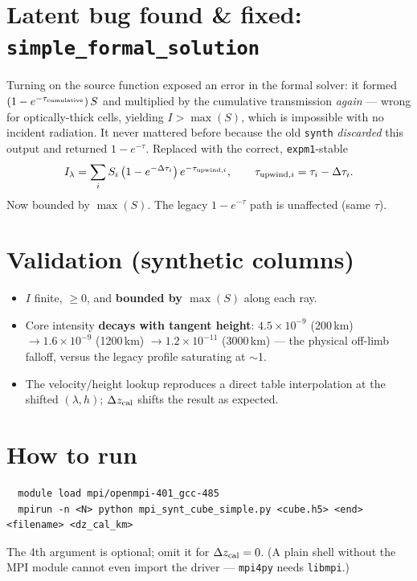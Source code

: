 \documentclass[10pt]{article}
\newcommand{\code}[1]{\texttt{\small #1}}
\begin{document}
\section{\textcolor{warn}{Latent bug found \& fixed:} \code{simple\_formal\_solution}}
Turning on the source function exposed an error in the formal solver: it formed
$(1-e^{-\tau_{\rm cumulative}})\,S$ and multiplied by the cumulative transmission
\emph{again} --- wrong for optically-thick cells, yielding $I>\max(S)$, which is
impossible with no incident radiation. It never mattered before because the old
\code{synth} \emph{discarded} this output and returned $1-e^{-\tau}$. Replaced with
the correct, \code{expm1}-stable
\[
  I_\lambda=\sum_i S_i\,\bigl(1-e^{-\Delta\tau_i}\bigr)\,e^{-\tau_{{\rm upwind},i}},
  \qquad \tau_{{\rm upwind},i}=\tau_i-\Delta\tau_i .
\]
Now bounded by $\max(S)$. The legacy $1-e^{-\tau}$ path is unaffected (same $\tau$).

\section{Validation (synthetic columns)}
\begin{itemize}
  \item $I$ finite, $\ge0$, and \textbf{bounded by $\max(S)$} along each ray.
  \item Core intensity \textbf{decays with tangent height}: $4.5\times10^{-9}$
    (200\,km) $\to 1.6\times10^{-9}$ (1200\,km) $\to 1.2\times10^{-11}$ (3000\,km) ---
    the physical off-limb falloff, versus the legacy profile saturating at $\sim$1.
  \item The velocity/height lookup reproduces a direct table interpolation at the
    shifted $(\lambda,h)$; $\Delta z_{\rm cal}$ shifts the result as expected.
\end{itemize}

\section{How to run}
\begin{verbatim}
  module load mpi/openmpi-401_gcc-485
  mpirun -n <N> python mpi_synt_cube_simple.py <cube.h5> <end> <filename> <dz_cal_km>
\end{verbatim}
The 4th argument is optional; omit it for $\Delta z_{\rm cal}=0$.
(A plain shell without the MPI module cannot even import the driver --- \code{mpi4py}
needs \code{libmpi}.)
\end{document}
